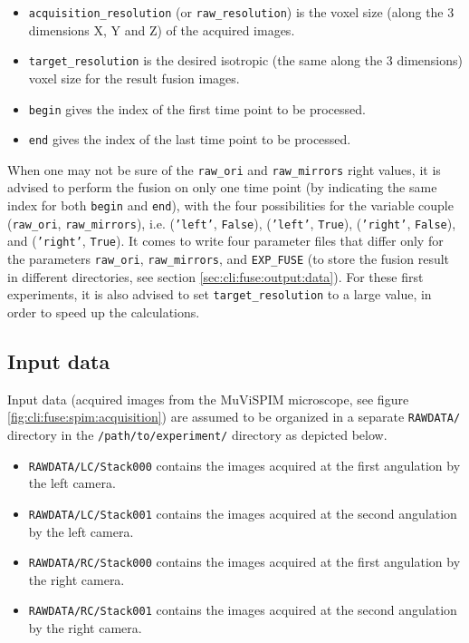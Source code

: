 \begin{itemize}
\item \texttt{acquisition\_resolution} (or \texttt{raw\_resolution}) is the voxel size (along the 3
    dimensions X, Y and Z) of the acquired images.
\item \texttt{target\_resolution} is the desired isotropic (the
    same along the 3 dimensions) voxel size for the result fusion
    images.
\item \texttt{begin} gives the index of the first time point to be
  processed.
\item \texttt{end} gives the index of the last time point to be processed.
\end{itemize}


When one may not be sure of the \texttt{raw\_ori} and
\texttt{raw\_mirrors} right values, it is advised to perform the
fusion on only one time point (by indicating the same index for both
\texttt{begin}  and \texttt{end}), with the four possibilities for the
variable couple (\texttt{raw\_ori}, \texttt{raw\_mirrors}), i.e.
(\texttt{'left'}, \texttt{False}),
(\texttt{'left'}, \texttt{True}),
(\texttt{'right'}, \texttt{False}), and
(\texttt{'right'}, \texttt{True}).
It comes to write four parameter files that differ only for the
parameters \texttt{raw\_ori}, \texttt{raw\_mirrors}, and
\texttt{EXP\_FUSE}  (to store the fusion result in different
directories, see section \ref{sec:cli:fuse:output:data}).
For these first experiments, it is also advised to set
\texttt{target\_resolution} to a large value, in order to speed up the
calculations.



\subsection{Input data}
\label{sec:cli:fuse:input:data}



Input data (acquired images from the MuViSPIM microscope, see figure \ref{fig:cli:fuse:spim:acquisition}) are assumed
to be organized in a separate \texttt{RAWDATA/} directory in the 
\texttt{/path/to/experiment/} directory as depicted below. 
\begin{itemize}
  \itemsep -0.5ex
\item \texttt{RAWDATA/LC/Stack000} contains the images acquired at the
  first angulation by the left camera.
\item \texttt{RAWDATA/LC/Stack001} contains the images acquired at the
  second angulation by the left camera.
\item \texttt{RAWDATA/RC/Stack000} contains the images acquired at the
  first angulation by the right camera.
\item \texttt{RAWDATA/RC/Stack001} contains the images acquired at the
  second angulation by the right camera.
\end{itemize}

